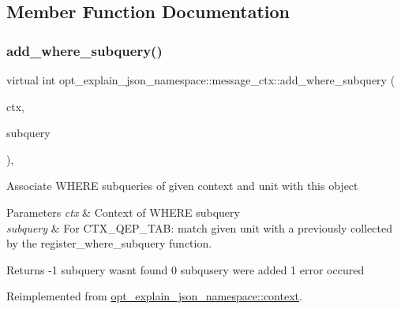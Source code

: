 \subsection{Member Function Documentation}
\mbox{\label{classopt__explain__json__namespace_1_1message__ctx_ade9097446404901fe19bd29cf0070cd0}} 
\subsubsection{\texorpdfstring{add\+\_\+where\+\_\+subquery()}{add\_where\_subquery()}}
{\footnotesize\ttfamily virtual int opt\+\_\+explain\+\_\+json\+\_\+namespace\+::message\+\_\+ctx\+::add\+\_\+where\+\_\+subquery (\begin{DoxyParamCaption}\item[{\mbox{\hyperlink{classopt__explain__json__namespace_1_1subquery__ctx}{subquery\+\_\+ctx}} $\ast$}]{ctx,  }\item[{S\+E\+L\+E\+C\+T\+\_\+\+L\+E\+X\+\_\+\+U\+N\+IT $\ast$}]{subquery }\end{DoxyParamCaption})\hspace{0.3cm}{\ttfamily [inline]}, {\ttfamily [virtual]}}

Associate W\+H\+E\+RE subqueries of given context and unit with this object


\begin{DoxyParams}{Parameters}
{\em ctx} & Context of W\+H\+E\+RE subquery \\
\hline
{\em subquery} & For C\+T\+X\+\_\+\+Q\+E\+P\+\_\+\+T\+AB\+: match given unit with a previously collected by the register\+\_\+where\+\_\+subquery function. \\
\hline
\end{DoxyParams}
\begin{DoxyReturn}{Returns}
-\/1 subquery wasn\textquotesingle{}t found 0 subqusery were added 1 error occured 
\end{DoxyReturn}


Reimplemented from \mbox{\hyperlink{classopt__explain__json__namespace_1_1context_ae6606674e90fec03200823c35994873c}{opt\+\_\+explain\+\_\+json\+\_\+namespace\+::context}}.

